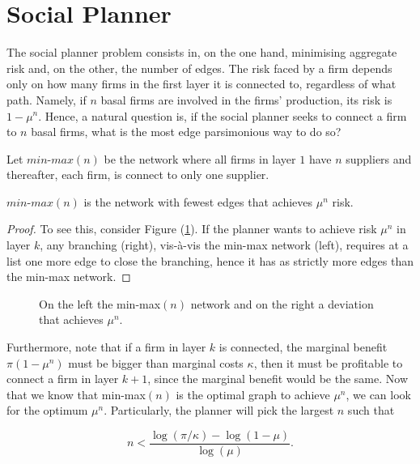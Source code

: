 \documentclass[../../main.tex]{subfiles}
\begin{document}
\section{Social Planner}

The social planner problem consists in, on the one hand, minimising aggregate risk and, on the other, the number of edges. The risk faced by a firm depends only on how many firms in the first layer it is connected to, regardless of what path. Namely, if $n$ basal firms are involved in the firms' production, its risk is $1 - \mu^n$. Hence, a natural question is, if the social planner seeks to connect a firm to $n$ basal firms, what is the most edge parsimonious way to do so? 

\begin{definition}
  Let $\textit{min-max}(n)$ be the network where all firms in layer $1$ have $n$ suppliers and thereafter, each firm, is connect to only one supplier. 
\end{definition}

\begin{lemma}
  $\textit{min-max}(n)$ is the network with fewest edges that achieves $\mu^n$ risk.
\end{lemma}

\begin{proof}

To see this, consider Figure (\ref{fig:planner-n-target}). If the planner wants to achieve risk $\mu^n$ in layer $k$, any branching (right), vis-à-vis the min-max network (left), requires at a list one more edge to close the branching, hence it has as strictly more edges than the min-max network.

\end{proof}

\begin{figure}[H]
  \centering
  \begin{subfigure}{.5\textwidth}
    \centering
  \end{subfigure}%
  \begin{subfigure}{.5\textwidth}
    \centering
  \end{subfigure}%
  \caption{On the left the min-max$(n)$ network and on the right a deviation that achieves $\mu^n$.}
  \label{fig:planner-n-target}
\end{figure}

Furthermore, note that if a firm in layer $k$ is connected, the marginal benefit $\pi (1 - \mu^n)$ must be bigger than marginal costs $\kappa$, then it must be profitable to connect a firm in layer $k + 1$, since the marginal benefit would be the same. Now that we know that min-max$(n)$ is the optimal graph to achieve $\mu^n$, we can look for the optimum $\mu^n$. Particularly, the planner will pick the largest $n$ such that

\begin{equation}
  n < \frac{\log(\pi / \kappa) - \log(1 - \mu)}{\log(\mu)}.
\end{equation}
\end{document}

